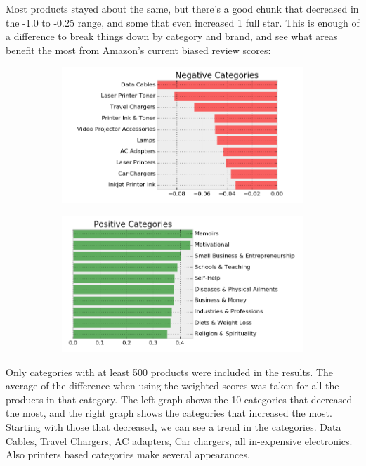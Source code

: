 \documentclass[a4paper,10pt]{article}
\begin{document}
Most products stayed about the same, but there's a good chunk that decreased in the -1.0 to -0.25 range, and some that even increased 1 full star. This is enough of a difference to break things down by category and brand, and see what areas benefit the most from Amazon's current biased review scores:

\begin{figure}[H]
\centering
\begin{subfigure}{.5\textwidth}
  \centering
  \includegraphics[width=1\linewidth]{change_by_category_neg.png}
  \label{fig:sub1}
\end{subfigure}%
\begin{subfigure}{.5\textwidth}
  \centering
  \includegraphics[width=1\linewidth]{change_by_category_pos.png}
  \label{fig:sub2}
\end{subfigure}
\label{fig:test}
\end{figure}

Only categories with at least 500 products were included in the results. The average of the difference when using the weighted scores was taken for all the products in that category. The left graph shows the 10 categories that decreased the most, and the right graph shows the categories that increased the most. Starting with those that decreased, we can see a trend in the categories. Data Cables, Travel Chargers, AC adapters, Car chargers, all in-expensive electronics. Also printers based categories make several appearances.
\end{document}
